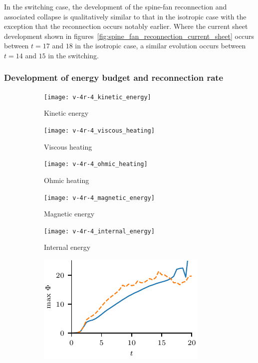 In the switching case, the development of the spine-fan reconnection and associated collapse is qualitatively similar to that in the isotropic case with the exception that the reconnection occurs notably earlier. Where the current sheet development shown in figures~\ref{fig:spine_fan_reconnection_current_sheet} occurs between $t=17$ and $18$ in the isotropic case, a similar evolution occurs between $t=14$ and $15$ in the switching.

\subsubsection{Development of energy budget and reconnection rate}

\begin{figure}[t]
  \centering
  \begin{subfigure}{0.32\textwidth}
    \texttt{[image: v-4r-4\_kinetic\_energy]}
    \caption{Kinetic energy}
    \label{fig:v-4r-4_kinetic_energy}
  \end{subfigure}
  \hfill
  \begin{subfigure}{0.32\textwidth}
    \texttt{[image: v-4r-4\_viscous\_heating]}
    \caption{Viscous heating}%
    \label{fig:v-4r-4_viscous_heating}
  \end{subfigure}
  \hfill
  \begin{subfigure}{0.32\textwidth}
    \texttt{[image: v-4r-4\_ohmic\_heating]}
    \caption{Ohmic heating}%
    \label{fig:v-4r-4_ohmic_heating}
  \end{subfigure}
  \hfill
  \begin{subfigure}{0.32\textwidth}
    \texttt{[image: v-4r-4\_magnetic\_energy]}
    \caption{Magnetic energy}%
    \label{fig:v-4r-4_magnetic_energy}
  \end{subfigure}
  \hfill
  \begin{subfigure}{0.32\textwidth}
    \texttt{[image: v-4r-4\_internal\_energy]}
    \caption{Internal energy}%
    \label{fig:v-4r-4_internal_energy}
  \end{subfigure}
  \hfill
  \begin{subfigure}{0.32\textwidth}
    \includegraphics[width=\linewidth]{v-4r-4_reconn_rate_over_time}

\end{subfigure}
\end{figure}
